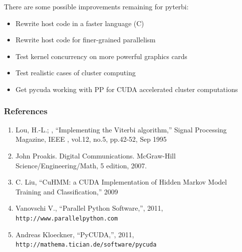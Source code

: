 \documentclass{beamer}
\begin{document}
   \begin{frame}
        There are some possible improvements remaining for pyterbi:
        \begin{itemize}
            \item Rewrite host code in a faster language (C)
            \item Rewrite host code for finer-grained parallelism
            \item Test kernel concurrency on more powerful graphics cards 
            \item Test realistic cases of cluster computing
            \item Get pycuda working with PP for CUDA accelerated cluster computations
        \end{itemize}
    \end{frame}

    \begin{frame}
        \frametitle{References}
        \begin{enumerate}
            \item Lou, H.-L.; , ``Implementing the Viterbi algorithm,'' Signal Processing Magazine, IEEE , vol.12, no.5, pp.42-52, Sep 1995
            \item John Proakis. Digital Communications. McGraw-Hill Science/Engineering/Math, 5 edition, 2007.
            \item C. Liu, ``CuHMM: a CUDA Implementation of Hidden Markov Model Training and Classification,'' 2009 
            \item Vanovschi V., ``Parallel Python Software,'', 2011, \texttt{http://www.parallelpython.com}
            \item Andreas Kloeckner, ``PyCUDA,'', 2011, \texttt{http://mathema.tician.de/software/pycuda}

        \end{enumerate}
    \end{frame}
\end{document}
